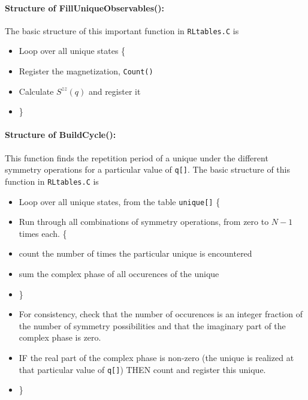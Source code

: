 \documentclass{article}
\begin{document}
\paragraph{Structure of FillUniqueObservables():} The basic structure of this important function in \verb+RLtables.C+ is
\begin{itemize}
\item Loop over all unique states \{
\item \hspace{5mm} Register the magnetization, \verb+Count()+
\item \hspace{5mm} Calculate $S^{zz}(q)$ and register it
\item \}
\end{itemize}

\paragraph{Structure of BuildCycle():} This function finds the repetition period of a unique under the different symmetry operations for a particular value of \verb+q[]+. The basic structure of this function in \verb+RLtables.C+ is
\begin{itemize}
\item Loop over all unique states, from the table \verb+unique[]+ \{
\item \hspace{5mm} Run through all combinations of symmetry operations, from zero to $N-1$ times each. \{
\item \hspace{10mm} count the number of times the particular unique is encountered 
\item \hspace{10mm} sum the complex phase of all occurences of the unique
\item \hspace{5mm} \}
\item \hspace{5mm} For consistency, check that the number of occurences is an integer fraction of the number of symmetry possibilities and that the imaginary part of the complex phase is zero.
\item \hspace{5mm} IF the real part of the complex phase is non-zero (the unique is realized at that particular value of \verb+q[]+) THEN count and register this unique.
\item \}
\end{itemize}
\end{document}
